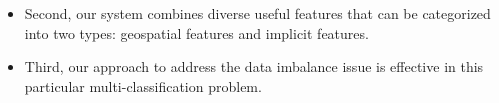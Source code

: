 \begin{itemize}
\item Second, our system combines diverse useful features that can be categorized into two types: geospatial features and implicit features. 

\item Third, our approach to address the data imbalance issue is effective in this particular multi-classification problem. 

\end{itemize}
